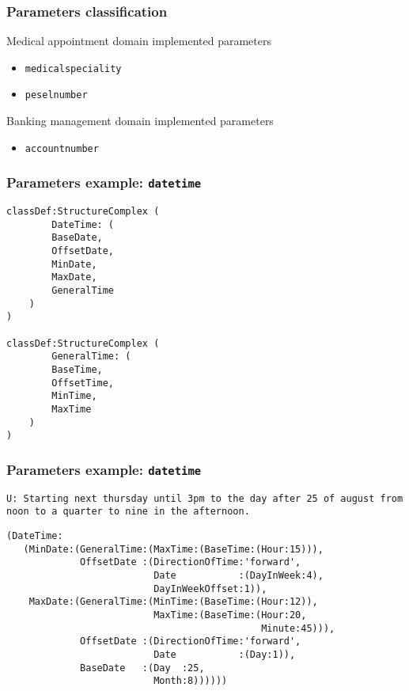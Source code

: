 \documentclass[11pt]{beamer}
\begin{document}
\begin{frame}[fragile]
\frametitle{Parameters classification}
	\begin{block}{Medical appointment domain implemented parameters}
		\begin{itemize}
			\item \texttt{medicalspeciality}
			\item \texttt{peselnumber}
		\end{itemize}
	\end{block}
	\begin{block}{Banking management domain implemented parameters}
		\begin{itemize}
			\item \texttt{accountnumber}
		\end{itemize}
	\end{block}
\end{frame}
	
\begin{frame}[fragile]
\frametitle{Parameters example: \texttt{datetime}}
\scriptsize
\begin{lstlisting}[language=lekta]
classDef:StructureComplex (
		DateTime: (
		BaseDate,
		OffsetDate,
		MinDate,
		MaxDate,
		GeneralTime
	)
)

classDef:StructureComplex (
		GeneralTime: (
		BaseTime,
		OffsetTime,
		MinTime,
		MaxTime
	)
)
\end{lstlisting}
\end{frame}
	
\begin{frame}[fragile]
\frametitle{Parameters example: \texttt{datetime}}
{\color{teal} 
	\texttt{U: Starting next thursday until 3pm to the day after 25 of august from noon to a quarter to nine in the afternoon.}\\
}
\pause
\vspace{15pt}
\scriptsize
\begin{lstlisting}[language=lekta]
(DateTime:
   (MinDate:(GeneralTime:(MaxTime:(BaseTime:(Hour:15))),
             OffsetDate :(DirectionOfTime:'forward',
                          Date           :(DayInWeek:4),
                          DayInWeekOffset:1)),
    MaxDate:(GeneralTime:(MinTime:(BaseTime:(Hour:12)),
                          MaxTime:(BaseTime:(Hour:20,
                                             Minute:45))),
             OffsetDate :(DirectionOfTime:'forward',
                          Date           :(Day:1)),
             BaseDate   :(Day  :25,
                          Month:8))))))
\end{lstlisting}
\end{frame}
	
\end{document}
